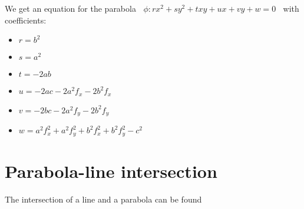 \documentclass[11pt,a4paper,english]{article}
\begin{document}
	We get an equation for the parabola \(\;\;
		\phi : rx^{2} + sy^{2} + txy + ux + vy + w = 0
	\;\;\)
	with coefficients:

	\begin{itemize}[label=\(\triangleright\)]\setlength{\itemsep}{-2pt}
    \item \(r = b^{2}\)
    \item \(s = a^{2}\)
    \item \(t = -2ab\)
    \item \(u = -2ac-2a^{2}f_{x}-2b^{2}f_{x}\)
    \item \(v = -2bc-2a^{2}f_{y}-2b^{2}f_{y}\)
    \item \(w = a^{2}f_{x}^{2} + a^{2}f_{y}^{2} + b^{2}f_{x}^{2} + b^{2}f_{y}^{2} - c^{2}\)
    \end{itemize}
    
    \newpage
    
    \section*{Parabola-line intersection}
    The intersection of a line and a parabola can be found 
    
\end{document}
